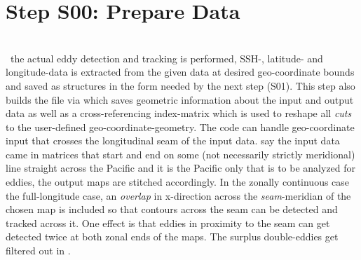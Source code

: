\section[Data Preparation]{Step S00: Prepare Data}
	\\
~the actual eddy detection and tracking is performed,  SSH-, latitude- and longitude-data is extracted from the given data at desired geo-coordinate bounds and saved as structures in the form needed by the next step (S01). This step also builds the file  via  which saves geometric information about the input and output data as well as a cross-referencing index-matrix which is used to reshape all \textit{cuts} to the user-defined geo-coordinate-geometry. The code can handle geo-coordinate input that crosses the longitudinal seam of
the input data. \Eg say the input data came in matrices that start and end on
some (not necessarily strictly meridional) line straight across the Pacific and
it is the Pacific only that is to be analyzed for eddies, the output maps are
stitched accordingly. In the zonally continuous case \ie the full-longitude case, an \textit{overlap} in x-direction across the \textit{seam}-meridian of the chosen map is included so that contours across the seam can be detected and tracked across it. One effect is that eddies in proximity to the seam can get detected twice at both zonal ends of the maps. The surplus double-eddies get filtered out in .

